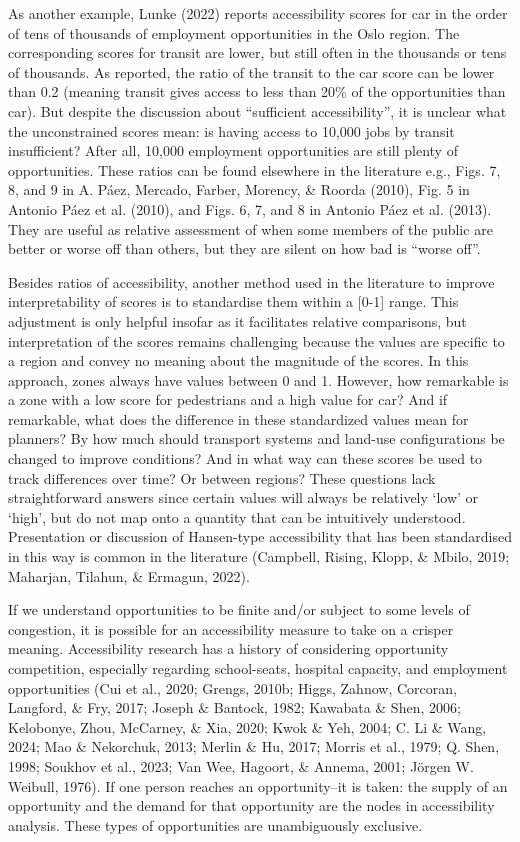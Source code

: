 \documentclass[
11pt, %
oneside, %
english, %
singlespacing, %
]{macthesis} %
\begin{document}
As another example, Lunke (2022) reports accessibility scores for car in the order of tens of thousands of employment opportunities in the Oslo region. The corresponding scores for transit are lower, but still often in the thousands or tens of thousands. As reported, the ratio of the transit to the car score can be lower than 0.2 (meaning transit gives access to less than 20\% of the opportunities than car). But despite the discussion about ``sufficient accessibility'', it is unclear what the unconstrained scores mean: is having access to 10,000 jobs by transit insufficient? After all, 10,000 employment opportunities are still plenty of opportunities. These ratios can be found elsewhere in the literature e.g., Figs. 7, 8, and 9 in A. Páez, Mercado, Farber, Morency, \& Roorda (2010), Fig. 5 in Antonio Páez et al. (2010), and Figs. 6, 7, and 8 in Antonio Páez et al. (2013). They are useful as relative assessment of when some members of the public are better or worse off than others, but they are silent on how bad is ``worse off''.

Besides ratios of accessibility, another method used in the literature to improve interpretability of scores is to standardise them within a {[}0-1{]} range. This adjustment is only helpful insofar as it facilitates relative comparisons, but interpretation of the scores remains challenging because the values are specific to a region and convey no meaning about the magnitude of the scores. In this approach, zones always have values between 0 and 1. However, how remarkable is a zone with a low score for pedestrians and a high value for car? And if remarkable, what does the difference in these standardized values mean for planners? By how much should transport systems and land-use configurations be changed to improve conditions? And in what way can these scores be used to track differences over time? Or between regions? These questions lack straightforward answers since certain values will always be relatively `low' or `high', but do not map onto a quantity that can be intuitively understood. Presentation or discussion of Hansen-type accessibility that has been standardised in this way is common in the literature (Campbell, Rising, Klopp, \& Mbilo, 2019; Maharjan, Tilahun, \& Ermagun, 2022).

If we understand opportunities to be finite and/or subject to some levels of congestion, it is possible for an accessibility measure to take on a crisper meaning. Accessibility research has a history of considering opportunity competition, especially regarding school-seats, hospital capacity, and employment opportunities (Cui et al., 2020; Grengs, 2010b; Higgs, Zahnow, Corcoran, Langford, \& Fry, 2017; Joseph \& Bantock, 1982; Kawabata \& Shen, 2006; Kelobonye, Zhou, McCarney, \& Xia, 2020; Kwok \& Yeh, 2004; C. Li \& Wang, 2024; Mao \& Nekorchuk, 2013; Merlin \& Hu, 2017; Morris et al., 1979; Q. Shen, 1998; Soukhov et al., 2023; Van Wee, Hagoort, \& Annema, 2001; Jörgen W. Weibull, 1976). If one person reaches an opportunity--it is taken: the supply of an opportunity and the demand for that opportunity are the nodes in accessibility analysis. These types of opportunities are unambiguously exclusive.
\end{document}
